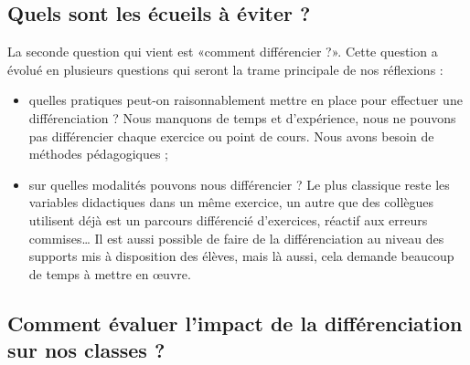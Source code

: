 \subsection{Quels sont les écueils à éviter ?}


La seconde question qui vient est «comment différencier ?». Cette question a évolué en plusieurs questions qui seront la trame principale de nos réflexions :
\begin{itemize}
    \item quelles pratiques peut-on raisonnablement mettre en place pour effectuer une différenciation ? Nous manquons de temps et d’expérience, nous ne pouvons pas différencier chaque exercice ou point de cours. Nous avons besoin de méthodes pédagogiques ;
    \item sur quelles modalités pouvons nous différencier ? Le plus classique reste les variables didactiques dans un même exercice, un autre que des collègues utilisent déjà est un parcours différencié d’exercices, réactif aux erreurs commises… Il est aussi possible de faire de la différenciation au niveau des supports mis à disposition des élèves, mais là aussi, cela demande beaucoup de temps à mettre en œuvre.
\end{itemize}


\subsection{Comment évaluer l'impact de la différenciation sur nos classes ?}



